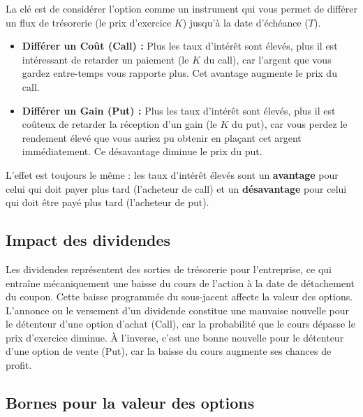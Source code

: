 \begin{intuitionbox}
La clé est de considérer l'option comme un instrument qui vous permet de différer un flux de trésorerie (le prix d'exercice $K$) jusqu'à la date d'échéance ($T$).

\begin{itemize}
    \item \textbf{Différer un Coût (Call) :} Plus les taux d'intérêt sont élevés, plus il est intéressant de retarder un paiement (le $K$ du call), car l'argent que vous gardez entre-temps vous rapporte plus. Cet avantage augmente le prix du call.
    \item \textbf{Différer un Gain (Put) :} Plus les taux d'intérêt sont élevés, plus il est coûteux de retarder la réception d'un gain (le $K$ du put), car vous perdez le rendement élevé que vous auriez pu obtenir en plaçant cet argent immédiatement. Ce désavantage diminue le prix du put.
\end{itemize}

L'effet est toujours le même : les taux d'intérêt élevés sont un \textbf{avantage} pour celui qui doit payer plus tard (l'acheteur de call) et un \textbf{désavantage} pour celui qui doit être payé plus tard (l'acheteur de put).
\end{intuitionbox}

\subsection{Impact des dividendes}

\begin{intuitionbox}
Les dividendes représentent des sorties de trésorerie pour l'entreprise, ce qui entraîne mécaniquement une baisse du cours de l'action à la date de détachement du coupon. Cette baisse programmée du sous-jacent affecte la valeur des options. L'annonce ou le versement d'un dividende constitue une mauvaise nouvelle pour le détenteur d'une option d'achat (Call), car la probabilité que le cours dépasse le prix d'exercice diminue. À l'inverse, c'est une bonne nouvelle pour le détenteur d'une option de vente (Put), car la baisse du cours augmente ses chances de profit.
\end{intuitionbox}

\subsection{Bornes pour la valeur des options}

